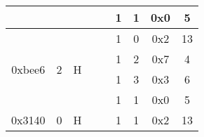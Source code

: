 \documentclass[11pt]{homework}
\begin{document}
\begin{arabicparts}
\begin{center}
\begin{tabular}{|c|c|c|c|c|c|c|c|c|}
            \cline{6-9}
                                     &                                                                        &                                                                   &                                                                    &                                                                      & 1                        & 1         & 0x0 & 5             \\
            \hline
            \multirow{4}{*}{0xbee6}  & \multirow{4}{*}{2}                                                     & \multirow{4}{*}{H}                                                & \multirow{4}{*}{}                                                  & \multirow{4}{*}{}                                                    & 1                        & 0         & 0x2 & 13            \\
            \cline{6-9}
                                     &                                                                        &                                                                   &                                                                    &                                                                      & 1                        & 2         & 0x7 & 4             \\
            \cline{6-9}
                                     &                                                                        &                                                                   &                                                                    &                                                                      & 1                        & 3         & 0x3 & 6             \\
            \cline{6-9}
                                     &                                                                        &                                                                   &                                                                    &                                                                      & 1                        & 1         & 0x0 & 5             \\
            \hline
            \multirow{4}{*}{0x3140}  & \multirow{4}{*}{0}                                                     & \multirow{4}{*}{H}                                                & \multirow{4}{*}{}                                                  & \multirow{4}{*}{}                                                    & 1                        & 1         & 0x2 & 13            \\

\end{tabular}
\end{center}
\end{arabicparts}
\end{document}

